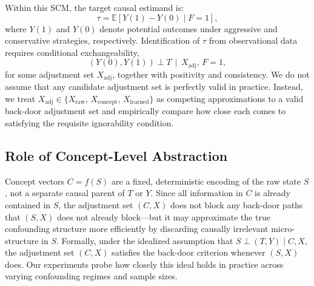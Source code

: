 \documentclass[11pt]{article}
\begin{document}
Within this SCM, the target causal estimand is:
\[
\tau = \mathbb{E}[Y(1) - Y(0) \mid F = 1],
\]
where \(Y(1)\) and \(Y(0)\) denote potential outcomes under aggressive and
conservative strategies, respectively. Identification of \(\tau\) from observational
data requires conditional exchangeability,
\[
(Y(0), Y(1)) \perp T \,\mid\, X_{\text{adj}},\, F=1,
\]
for some adjustment set \(X_{\text{adj}}\), together with positivity and
consistency.\cite{pearl2009causality,hill2011bayesian} We do not assume that any
candidate adjustment set is perfectly valid in practice. Instead, we treat
$X_{\text{adj}} \in \{ X_{\text{raw}},\, X_{\text{concept}},\, X_{\text{learned}} \}$
as competing approximations to a valid back-door adjustment set and empirically
compare how close each comes to satisfying the requisite ignorability condition.

\subsection*{Role of Concept-Level Abstraction}

Concept vectors \(C = f(S)\) are a fixed, deterministic encoding of the raw state
\(S\), not a separate causal parent of \(T\) or \(Y\). Since all information in
\(C\) is already contained in \(S\), the adjustment set \((C, X)\) does not block
any back-door paths that \((S, X)\) does not already block---but it may approximate
the true confounding structure more efficiently by discarding causally irrelevant
micro-structure in \(S\). Formally, under the idealized assumption that $S \perp
(T,Y) \mid C, X$, the adjustment set $(C, X)$ satisfies the back-door criterion
whenever $(S, X)$ does. Our experiments probe how closely this ideal holds in
practice across varying confounding regimes and sample sizes.
\end{document}
